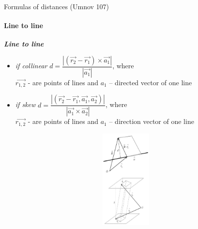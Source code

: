 \documentclass[aspectratio=169]{beamer}
\begin{document}
\begin{frame}[t]{Formulas of distances (Umnov 107)}
    \framesubtitle{Line to line}
    \begin{minipage}{0.6\textwidth}
        \textbf{\textit{Line to line}}\begin{itemize}
            \item \textit{if collinear} $d = \dfrac{|(\vec{r_2}-\vec{r_1}) \times \vec{a_1}| }{|\vec{a_1}|}$, where \\ $\vec{r_{1,2}}$ - are points of lines and $a_1$ -- directed vector of one line
            \item \textit{if skew} $d = \dfrac{|(\vec{r_2}-\vec{r_1},\vec{a_1},\vec{a_2})| }{|\vec{a_1}\times\vec{a_2}|}$, where \\ $\vec{r_{1,2}}$ - are points of lines and $a_1$ -- direction vector of one line
        \end{itemize}
    \end{minipage}
    \begin{minipage}{0.39\textwidth}
        \begin{figure}[H]
            \centering\includegraphics[height=5cm,width=1\textwidth,keepaspectratio]{distance_2.png}
            \label{fig:distance_2.png}
        \end{figure}
    \end{minipage}
\end{frame}
\end{document}
